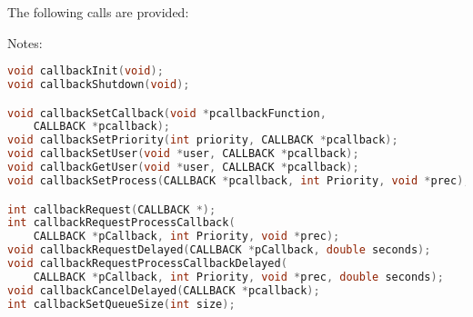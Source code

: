 The following calls are provided:

Notes:
\begin{lstlisting}[language=C]
void callbackInit(void);
void callbackShutdown(void);

void callbackSetCallback(void *pcallbackFunction,
    CALLBACK *pcallback);
void callbackSetPriority(int priority, CALLBACK *pcallback);
void callbackSetUser(void *user, CALLBACK *pcallback);
void callbackGetUser(void *user, CALLBACK *pcallback);
void callbackSetProcess(CALLBACK *pcallback, int Priority, void *prec);

int callbackRequest(CALLBACK *);
int callbackRequestProcessCallback(
    CALLBACK *pCallback, int Priority, void *prec);
void callbackRequestDelayed(CALLBACK *pCallback, double seconds);
void callbackRequestProcessCallbackDelayed(
    CALLBACK *pCallback, int Priority, void *prec, double seconds);
void callbackCancelDelayed(CALLBACK *pcallback);
int callbackSetQueueSize(int size);
\end{lstlisting}

